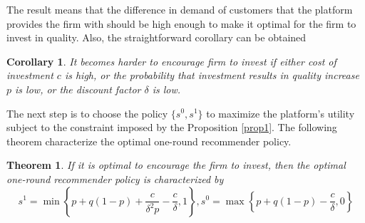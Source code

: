 \documentclass[a4paper]{article}
\newtheorem{theorem}{Theorem}
\newtheorem{corollary}{Corollary}[theorem]
\begin{document}
The result means that the difference in demand of customers that the platform provides the firm with should be high enough to make it optimal for the firm to invest in quality. Also, the straightforward corollary can be obtained
\begin{corollary}
	It becomes harder to encourage firm to invest if either cost of investment $c$ is high, or the probability that investment results in quality increase $p$ is low, or the discount factor $\delta$ is low.
\end{corollary}




The next step is to choose the policy $\{s^0, s^1\}$ to maximize the platform's utility subject to the constraint imposed by the Proposition \ref{prop1}. The following theorem characterize the optimal one-round recommender policy.
\begin{theorem}
	If it is optimal to encourage the firm to invest, then the optimal one-round recommender policy is characterized by $$s^1 = \min \left\{ p + q(1-p) + \frac{c}{\delta^2 p} - \frac{c}{\delta}, 1\right\}, s^0 = \max\left\{ p + q(1-p) - \frac{c}{\delta}, 0\right\}$$
\end{theorem} 
\end{document}
